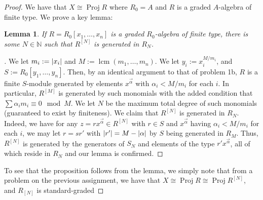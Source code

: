 \documentclass[english,letter,doublesided]{article}
\let\avec=\vec
\renewcommand\vec{\mathbf}
\DeclarePairedDelimiter\abs{\lvert}{\rvert}%
\newcommand{\NN}{\mathbb{N}}
\newenvironment{subproof}[1][\proofname]{%
	\renewcommand{\qedsymbol}{$\blacksquare$}%
	\begin{proof}[#1]%
	}{%
	\end{proof}%
}
\newcommand{\prob}[1]{\setcounter{section}{#1-1}\section{}}
\newtheorem{lemma}[thm]{Lemma}
\theoremstyle{remark}
\theoremstyle{definition}
\DeclareMathOperator{\proj}{Proj}
\DeclareMathOperator{\lcm}{lcm}
\begin{document}
\begin{proof}
We have that $X\cong \proj R$ where $R_0=A$ and $R$ is a graded $A$-algebra of finite type. We prove a key lemma:
	\begin{lemma}
		If $R=R_0[x_1,\dots,x_n]$ is a graded $R_0$-algebra of finite type, there is some $N\in \NN$ such that $R^{[N]}$ is generated in $R_N$.
	\end{lemma}
	\begin{subproof}
		We let $m_i:=\abs{x_i}$ and $M:=\lcm(m_1,\dots,m_n)$. We let $y_i:=x_i^{M/m_i}$, and $S:=R_0[y_1,\dots,y_n]$. Then, by an identical argument to that of problem 1b, $R$ is a finite $S$-module generated by elements $x^{\avec{\alpha}}$ with $\alpha_i<M/m_i$ for each $i$. In particular, $R^{[M]}$ is generated by such monomials with the added condition that $\sum \alpha_i m_i\equiv 0 \mod M$. We let $N$ be the maximum total degree of such monomials (guaranteed to exist by finiteness). We claim that $R^{[N]}$ is generated in $R_N$. Indeed, we have for any $z=rx^{\avec{\alpha}}\in R^{[N]}$ with $r\in S$ and $x^{\avec{\alpha}}$ having  $\alpha_i<M/m_i$ for each $i$, we may let $r=sr'$ with $\abs{r'}=M-\abs{\avec{\alpha}}$ by $S$ being generated in $R_M$. Thus, $R^{[N]}$ is generated by the generators of $S_N$ and elements of the type $r'x^{\avec{\alpha}}$, all of which reside in $R_N$ and our lemma is confirmed.
	\end{subproof}
To see that the proposition follows from the lemma, we simply note that from a problem on the previous assignment, we have that $X\cong\proj R\cong \proj R^{[N]}$, and $R_{[N]}$ is standard-graded
\end{proof}
	\prob{3}
\end{document}
